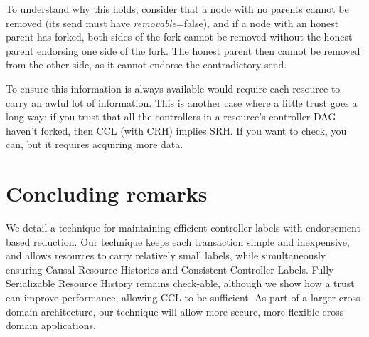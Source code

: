 \documentclass[a4paper,USenglish,cleveref, autoref, thm-restate, anonymous]{lipics-v2021}
\begin{document}
To understand why this holds, consider that a node with no parents cannot be removed (its send must have \emph{removable}=false), and if a node with an honest parent has forked, both sides of the fork cannot be removed without the honest parent endorsing one side of the fork.
The honest parent then cannot be removed from the other side, as it cannot endorse the contradictory send.

To ensure this information is always available would require each resource to carry an awful lot of information.
This is another case where a little trust goes a long way: if you trust that all the controllers in a resource's controller DAG haven't forked, then CCL (with CRH) implies SRH.
If you want to check, you can, but it requires acquiring more data.














 
\section{Concluding remarks}
We detail a technique for maintaining efficient controller labels with endorsement-based reduction.
Our technique keeps each transaction simple and inexpensive, and allows resources to carry relatively small labels, while simultaneously ensuring Causal Resource Histories and Consistent Controller Labels.
Fully Serializable Resource History remains check-able, although we show how a trust can improve performance, allowing CCL to be sufficient.
As part of a larger cross-domain architecture, our technique will allow more secure, more flexible cross-domain applications.
\end{document}
